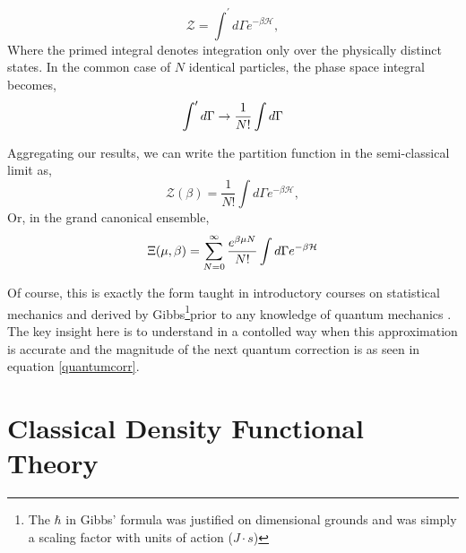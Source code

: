 \begin{equation}
    \mathcal{Z} = \int^\prime d\Gamma e^{-\beta \mathcal{H}},
\end{equation}
Where the primed integral denotes integration only over the physically distinct states. In the common case of $N$ identical particles, the phase space integral becomes, 
\begin{equation}
    \int^\prime d\Gamma \rightarrow \frac{1}{N!}\int d\Gamma
\end{equation}

Aggregating our results, we can write the partition function in the semi-classical limit as,
\begin{equation}
    \mathcal{Z}(\beta) = \frac{1}{N!}\int d\Gamma e^{-\beta \mathcal{H}},
\end{equation}
Or, in the grand canonical ensemble,
\begin{equation}
    \Xi(\mu, \beta) = \sum_{N = 0}^\infty \frac{e^{\beta\mu N}}{N!} \int d\Gamma e^{-\beta \mathcal{H}}
\end{equation}

Of course, this is exactly the form taught in introductory courses on statistical mechanics and derived by Gibbs\footnote{The $\hbar$ in Gibbs' formula was justified on dimensional grounds and was simply a scaling factor with units of action ($J\cdot s$)}prior to any knowledge of quantum mechanics \cite{Gibbs}.
The key insight here is to understand in a contolled way when this approximation is accurate and the magnitude of the next quantum correction is as seen in equation \ref{quantumcorr}.

\section{Classical Density Functional Theory}


